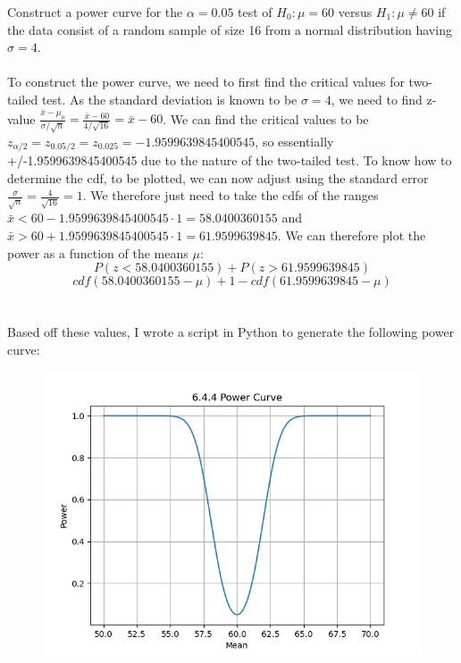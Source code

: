 \documentclass{article}
\begin{document}
{Construct a power curve for the \(\alpha = 0.05\) test of \(H_0: \mu = 60\) versus \(H_1: \mu \neq 60\) if the data consist of a random sample of size 16 from a normal distribution having \(\sigma = 4\).
\\
\\
To construct the power curve, we need to first find the critical values for two-tailed test. As the standard deviation is known to be \(\sigma = 4\), we need to find z-value \(\frac{\bar{x} - \mu_0}{\sigma / \sqrt{n}} = \frac{\bar{x} - 60}{4 / \sqrt{16}} = \bar{x} - 60\). We can find the critical values to be \(z_{\alpha / 2} = z_{0.05 / 2} = z_{0.025} = -1.9599639845400545\), so essentially +/-1.9599639845400545 due to the nature of the two-tailed test. To know how to determine the cdf, to be plotted, we can now adjust using the standard error \(\frac{\sigma}{\sqrt{n}} = \frac{4}{\sqrt{16}} = 1\). We therefore just need to take the cdfs of the ranges \(\bar{x} < 60 - 1.9599639845400545 \cdot 1 = 58.0400360155\) and \(\bar{x} > 60 + 1.9599639845400545 \cdot 1 = 61.9599639845\). We can therefore plot the power as a function of the means \(\mu\):
\[
P(z < 58.0400360155) + P(z > 61.9599639845)
\]
\[
cdf(58.0400360155 - \mu) + 1 - cdf(61.9599639845 - \mu)
\]
\\
\\ 
Based off these values, I wrote a script in Python to generate the following power curve:
\begin{figure}[h!]
  \centering
  \includegraphics[width=500pt]{power_curve.png}
\end{figure}
\\
\\
}
\end{document}
